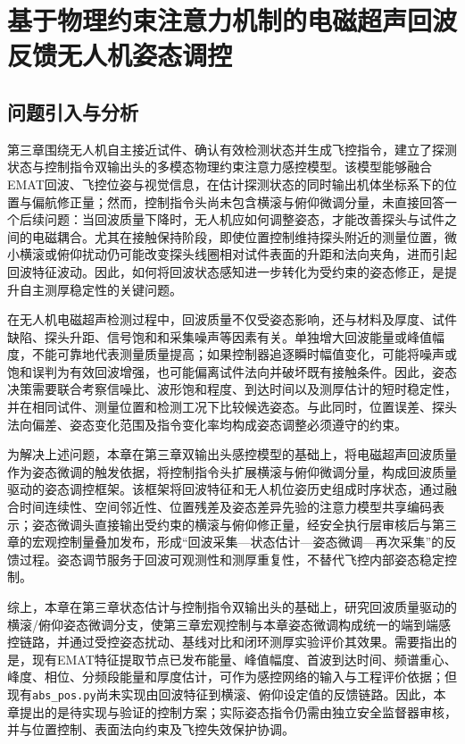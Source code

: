 \chapter{基于物理约束注意力机制的电磁超声回波反馈无人机姿态调控}

\section{问题引入与分析}

第三章围绕无人机自主接近试件、确认有效检测状态并生成飞控指令，建立了探测状态与控制指令双输出头的多模态物理约束注意力感控模型。该模型能够融合EMAT回波、飞控位姿与视觉信息，在估计探测状态的同时输出机体坐标系下的位置与偏航修正量；然而，控制指令头尚未包含横滚与俯仰微调分量，未直接回答一个后续问题：当回波质量下降时，无人机应如何调整姿态，才能改善探头与试件之间的电磁耦合。尤其在接触保持阶段，即使位置控制维持探头附近的测量位置，微小横滚或俯仰扰动仍可能改变探头线圈相对试件表面的升距和法向夹角，进而引起回波特征波动。因此，如何将回波状态感知进一步转化为受约束的姿态修正，是提升自主测厚稳定性的关键问题。

在无人机电磁超声检测过程中，回波质量不仅受姿态影响，还与材料及厚度、试件缺陷、探头升距、信号饱和和采集噪声等因素有关。单独增大回波能量或峰值幅度，不能可靠地代表测量质量提高；如果控制器追逐瞬时幅值变化，可能将噪声或饱和误判为有效回波增强，也可能偏离试件法向并破坏既有接触条件。因此，姿态决策需要联合考察信噪比、波形饱和程度、到达时间以及测厚估计的短时稳定性，并在相同试件、测量位置和检测工况下比较候选姿态。与此同时，位置误差、探头法向偏差、姿态变化范围及指令变化率均构成姿态调整必须遵守的约束。

为解决上述问题，本章在第三章双输出头感控模型的基础上，将电磁超声回波质量作为姿态微调的触发依据，将控制指令头扩展横滚与俯仰微调分量，构成回波质量驱动的姿态调控框架。该框架将回波特征和无人机位姿历史组成时序状态，通过融合时间连续性、空间邻近性、位置残差及姿态差异先验的注意力模型共享编码表示；姿态微调头直接输出受约束的横滚与俯仰修正量，经安全执行层审核后与第三章的宏观控制量叠加发布，形成“回波采集—状态估计—姿态微调—再次采集”的反馈过程。姿态调节服务于回波可观测性和测厚重复性，不替代飞控内部姿态稳定控制。

综上，本章在第三章状态估计与控制指令双输出头的基础上，研究回波质量驱动的横滚/俯仰姿态微调分支，使第三章宏观控制与本章姿态微调构成统一的端到端感控链路，并通过受控姿态扰动、基线对比和闭环测厚实验评价其效果。需要指出的是，现有EMAT特征提取节点已发布能量、峰值幅度、首波到达时间、频谱重心、峰度、相位、分频段能量和厚度估计，可作为感控网络的输入与工程评价依据；但现有\texttt{abs\_pos.py}尚未实现由回波特征到横滚、俯仰设定值的反馈链路。因此，本章提出的是待实现与验证的控制方案；实际姿态指令仍需由独立安全监督器审核，并与位置控制、表面法向约束及飞控失效保护协调。

